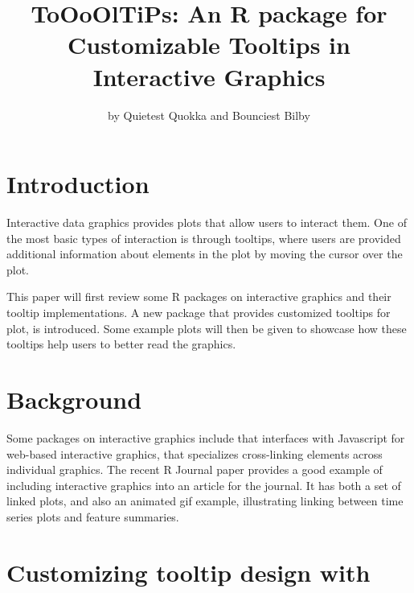 \title{ToOoOlTiPs: An R package for Customizable Tooltips in Interactive
Graphics}
\author{by Quietest Quokka and Bounciest Bilby}

\maketitle


\hypertarget{introduction}{%
\section{Introduction}\label{introduction}}

Interactive data graphics provides plots that allow users to interact
them. One of the most basic types of interaction is through tooltips,
where users are provided additional information about elements in the
plot by moving the cursor over the plot.

This paper will first review some R packages on interactive graphics and
their tooltip implementations. A new package  that
provides customized tooltips for plot, is introduced. Some example plots
will then be given to showcase how these tooltips help users to better
read the graphics.

\hypertarget{background}{%
\section{Background}\label{background}}

Some packages on interactive graphics include 
\citep{plotly} that interfaces with Javascript for web-based interactive
graphics,  \citep{crosstalk} that specializes
cross-linking elements across individual graphics. The recent R Journal
paper  \citep{RJ-2021-050} provides a good example
of including interactive graphics into an article for the journal. It
has both a set of linked plots, and also an animated gif example,
illustrating linking between time series plots and feature summaries.

\hypertarget{customizing-tooltip-design-with}{%
\section{\texorpdfstring{Customizing tooltip design with
}{Customizing tooltip design with }}\label{customizing-tooltip-design-with}}

